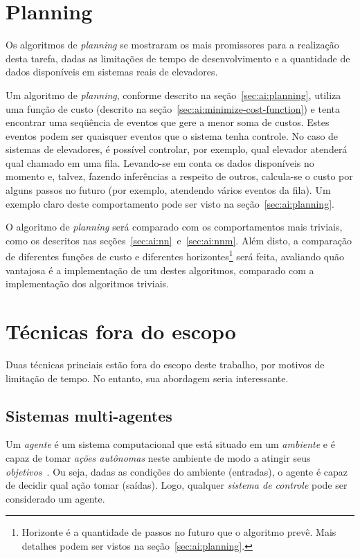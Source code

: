 \section{\label{sec:proposal:planning}Planning}

Os algoritmos de \textit{planning} se mostraram os mais promissores para a
realização desta tarefa, dadas as limitações de tempo de desenvolvimento e a
quantidade de dados disponíveis em sistemas reais de elevadores.

Um algoritmo de \textit{planning}, conforme descrito na
seção~\ref{sec:ai:planning}, utiliza uma função de custo (descrito na
seção~\ref{sec:ai:minimize-cost-function}) e tenta encontrar uma seqüência de
eventos que gere a menor soma de custos. Estes eventos podem ser quaisquer
eventos que o sistema tenha controle. No caso de sistemas de elevadores, é
possível controlar, por exemplo, qual elevador atenderá qual chamado em uma
fila. Levando-se em conta os dados disponíveis no momento e, talvez, fazendo
inferências a respeito de outros, calcula-se o custo por alguns passos no futuro
(por exemplo, atendendo vários eventos da fila). Um exemplo claro deste
comportamento pode ser visto na seção~\ref{sec:ai:planning}.

O algoritmo de \textit{planning} será comparado com os comportamentos mais
triviais, como os descritos nas seções~\ref{sec:ai:nn}~e~\ref{sec:ai:nnm}. Além
disto, a comparação de diferentes funções de custo e diferentes
horizontes\footnote{Horizonte é a quantidade de passos no futuro que o algoritmo
prevê. Mais detalhes podem ser vistos na seção~\ref{sec:ai:planning}.} será
feita, avaliando quão vantajosa é a implementação de um destes algoritmos,
comparado com a implementação dos algoritmos triviais.

\section{\label{sec:proposal:out-of-scope}Técnicas fora do escopo}

Duas técnicas princiais estão fora do escopo deste trabalho, por motivos de
limitação de tempo. No entanto, sua abordagem seria interessante.

\subsection{\label{section:multiagentes}Sistemas multi-agentes}

Um \textit{agente} é um sistema computacional que está situado em um \textit{ambiente} e é capaz de tomar \textit{ações autônomas} neste ambiente de modo a atingir seus \textit{objetivos}~\cite{Woolridge:2001:IMS:559667}. Ou seja, dadas as condições do ambiente (entradas), o agente é capaz de decidir qual ação tomar (saídas). Logo, qualquer \textit{sistema de controle} pode ser considerado um agente.

